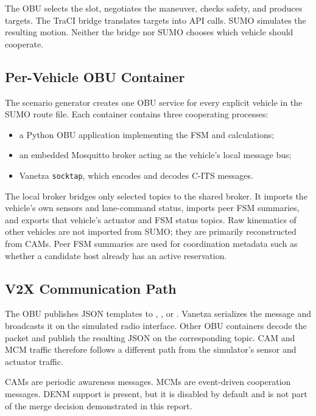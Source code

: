 \documentclass[a4paper,12pt]{article}
\begin{document}
\begin{keypoint}
The OBU selects the slot, negotiates the maneuver, checks safety, and produces targets. The TraCI bridge translates targets into API calls. SUMO simulates the resulting motion. Neither the bridge nor SUMO chooses which vehicle should cooperate.
\end{keypoint}

\subsection{Per-Vehicle OBU Container}

The scenario generator creates one OBU service for every explicit vehicle in the SUMO route file. Each container contains three cooperating processes:

\begin{itemize}
    \item a Python OBU application implementing the FSM and calculations;
    \item an embedded Mosquitto broker acting as the vehicle's local message bus;
    \item Vanetza \texttt{socktap}, which encodes and decodes C-ITS messages.
\end{itemize}

The local broker bridges only selected topics to the shared broker. It imports the vehicle's own sensors and lane-command status, imports peer FSM summaries, and exports that vehicle's actuator and FSM status topics. Raw kinematics of other vehicles are not imported from SUMO; they are primarily reconstructed from CAMs. Peer FSM summaries are used for coordination metadata such as whether a candidate host already has an active reservation.

\subsection{V2X Communication Path}

The OBU publishes JSON templates to , , or . Vanetza serializes the message and broadcasts it on the simulated radio interface. Other OBU containers decode the packet and publish the resulting JSON on the corresponding  topic. CAM and MCM traffic therefore follows a different path from the simulator's sensor and actuator traffic.

CAMs are periodic awareness messages. MCMs are event-driven cooperation messages. DENM support is present, but it is disabled by default and is not part of the merge decision demonstrated in this report.
\end{document}
